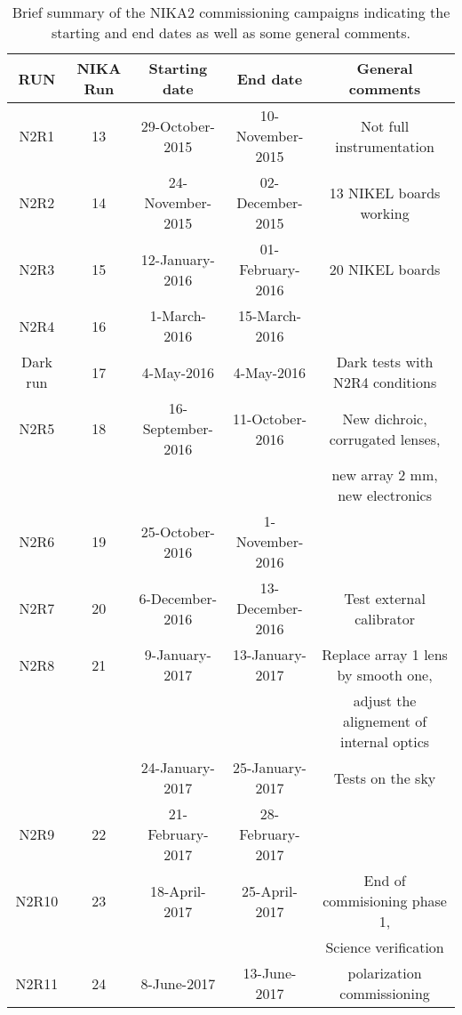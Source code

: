 \begin{table}[h]
\small
\begin{center} 
\begin{tabular}{|c|c|c|c|c|}
\hline 
RUN  & NIKA Run & Starting date    & End date         &  General comments \\
\hline
N2R1     & 13       & 29-October-2015   & 10-November-2015 & Not full instrumentation        \\
N2R2     & 14       & 24-November-2015  & 02-December-2015 & 13 NIKEL boards working         \\
N2R3     & 15       & 12-January-2016   & 01-February-2016 & 20 NIKEL boards                 \\
N2R4     & 16       & 1-March-2016      & 15-March-2016    & 	                               \\
Dark run & 17       & 4-May-2016        & 4-May-2016       & Dark tests with N2R4 conditions  \\
\hline
N2R5     & 18       & 16-September-2016 & 11-October-2016  & New dichroic, corrugated lenses, \\
         &          &                   &                  &  new array 2 mm, new electronics \\
N2R6     & 19       & 25-October-2016   & 1-November-2016  &                                  \\
N2R7     & 20       & 6-December-2016   & 13-December-2016 & Test external calibrator         \\
N2R8     & 21       & 9-January-2017    & 13-January-2017  & Replace array 1 lens by smooth one, \\
         &          &                   &                  &  adjust the alignement of internal optics \\ 
         &          & 24-January-2017   & 25-January-2017  & Tests on the sky   \\
N2R9     & 22       & 21-February-2017  & 28-February-2017 &                                   \\
N2R10    & 23       & 18-April-2017     & 25-April-2017    & End of commisioning phase 1,     \\
         &          &                   &                  & Science verification  \\  
N2R11    & 24       &  8-June-2017      & 13-June-2017     &  polarization commissioning  \\
\hline
\end{tabular}
\caption[Commissioning campaigns, dates and general comments.]{
Brief summary of the NIKA2 commissioning campaigns indicating the starting and end dates as well as
some general comments.
\label{nika2runs}}
\end{center} 
\end{table} 

